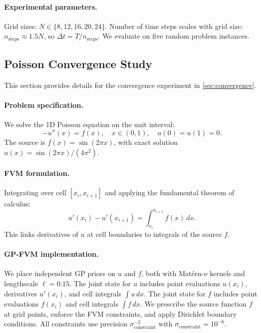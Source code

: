\documentclass{article}
\theoremstyle{plain}
\theoremstyle{definition}
\theoremstyle{remark}
\begin{document}
\paragraph{Experimental parameters.}
Grid sizes: $N \in \{8, 12, 16, 20, 24\}$.
Number of time steps scales with grid size: $n_{\text{steps}} \approx 1.5 N$, so $\Delta t = T / n_{\text{steps}}$.
We evaluate on five random problem instances.

\subsection{Poisson Convergence Study}
\label{app:poisson}

This section provides details for the convergence experiment in \cref{sec:convergence}.

\paragraph{Problem specification.}
We solve the 1D Poisson equation on the unit interval:
\begin{equation}
  -u''(x) = f(x), \quad x \in (0, 1), \quad u(0) = u(1) = 0.
\end{equation}
The source is $f(x) = \sin(2\pi x)$, with exact solution $u(x) = \sin(2\pi x) / (4\pi^2)$.

\paragraph{FVM formulation.}
Integrating over cell $[x_i, x_{i+1}]$ and applying the fundamental theorem of calculus:
\begin{equation}
  u'(x_i) - u'(x_{i+1}) = \int_{x_i}^{x_{i+1}} f(x) \, dx.
\end{equation}
This links derivatives of $u$ at cell boundaries to integrals of the source $f$.

\paragraph{GP-FVM implementation.}
We place independent GP priors on $u$ and $f$, both with Mat\'ern-$\nu$ kernels and lengthscale $\ell = 0.15$.
The joint state for $u$ includes point evaluations $u(x_i)$, derivatives $u'(x_i)$, and cell integrals $\int u \, dx$.
The joint state for $f$ includes point evaluations $f(x_i)$ and cell integrals $\int f \, dx$.
We prescribe the source function $f$ at grid points, enforce the FVM constraints, and apply Dirichlet boundary conditions.
All constraints use precision $\sigma_{\text{constraint}}^{-2}$ with $\sigma_{\text{constraint}} = 10^{-6}$.
\end{document}
